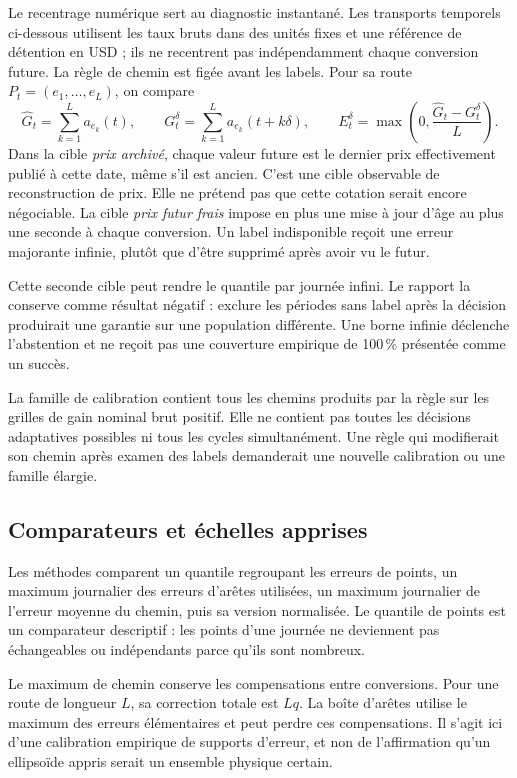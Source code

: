 Le recentrage numérique sert au diagnostic instantané. Les transports temporels ci-dessous utilisent les taux bruts dans des unités fixes et une référence de détention en USD ; ils ne recentrent pas indépendamment chaque conversion future. La règle de chemin est figée avant les labels. Pour sa route \(P_t=(e_1,\ldots,e_L)\), on compare
\begin{equation}
 \widehat G_t=\sum_{k=1}^L a_{e_k}(t),\qquad
 G_t^\delta=\sum_{k=1}^L a_{e_k}(t+k\delta),\qquad
 E_t^\delta=\max\left(0,\frac{\widehat G_t-G_t^\delta}{L}\right).
 \label{eq:emp-price-target}
\end{equation}
Dans la cible \emph{prix archivé}, chaque valeur future est le dernier prix effectivement publié à cette date, même s'il est ancien. C'est une cible observable de reconstruction de prix. Elle ne prétend pas que cette cotation serait encore négociable. La cible \emph{prix futur frais} impose en plus une mise à jour d'âge au plus une seconde à chaque conversion. Un label indisponible reçoit une erreur majorante infinie, plutôt que d'être supprimé après avoir vu le futur.

Cette seconde cible peut rendre le quantile par journée infini. Le rapport la conserve comme résultat négatif : exclure les périodes sans label après la décision produirait une garantie sur une population différente. Une borne infinie déclenche l'abstention et ne reçoit pas une couverture empirique de 100\,\% présentée comme un succès.

La famille de calibration contient tous les chemins produits par la règle sur les grilles de gain nominal brut positif. Elle ne contient pas toutes les décisions adaptatives possibles ni tous les cycles simultanément. Une règle qui modifierait son chemin après examen des labels demanderait une nouvelle calibration ou une famille élargie.

\subsection{Comparateurs et échelles apprises}

Les méthodes comparent un quantile regroupant les erreurs de points, un maximum journalier des erreurs d'arêtes utilisées, un maximum journalier de l'erreur moyenne du chemin, puis sa version normalisée. Le quantile de points est un comparateur descriptif : les points d'une journée ne deviennent pas échangeables ou indépendants parce qu'ils sont nombreux.

Le maximum de chemin conserve les compensations entre conversions. Pour une route de longueur \(L\), sa correction totale est \(Lq\). La boîte d'arêtes utilise le maximum des erreurs élémentaires et peut perdre ces compensations. Il s'agit ici d'une calibration empirique de supports d'erreur, et non de l'affirmation qu'un ellipsoïde appris serait un ensemble physique certain.

